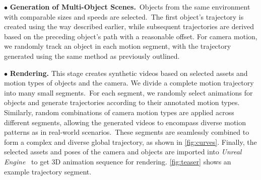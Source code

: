 \noindent$\bullet$
\textbf{Generation of Multi-Object Scenes.}~Objects from the same environment with comparable sizes and speeds are selected.~The first object’s trajectory is created using the way described earlier, while subsequent trajectories are derived based on the preceding object’s path with a reasonable offset. For camera motion, we randomly track an object in each motion segment, with the trajectory generated using the same method as previously outlined.





\noindent$\bullet$
\textbf{Rendering.} This stage creates synthetic videos based on selected assets and motion types of objects and the camera. We divide a complete motion trajectory into many small segments.~For each segment, we randomly select animations for objects and generate trajectories according to their annotated motion types. Similarly, random combinations of camera motion types are applied across different segments, allowing the generated videos to encompass diverse motion patterns as in real-world scenarios.~These segments are seamlessly combined to form a complex and diverse global trajectory, as shown in \cref{fig:curves}. Finally, the selected assets and poses of the camera and objects are imported into \emph{Unreal Engine}~\cite{unrealengine} to get 3D animation sequence for rendering. \cref{fig:teaser} shows an example trajectory segment.